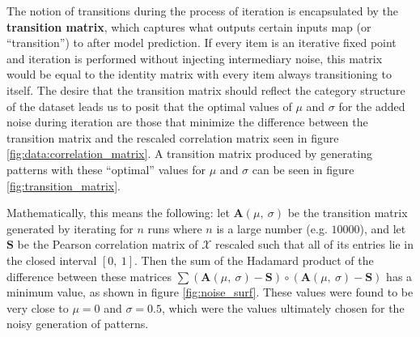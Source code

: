 \documentclass[11pt]{article}
\theoremstyle{remark}
\begin{document}
The notion of transitions during the process of iteration is encapsulated by the \textbf{transition matrix}, which captures what outputs certain inputs map (or ``transition'') to after model prediction. If every item is an iterative fixed point and iteration is performed without injecting intermediary noise, this matrix would be equal to the identity matrix with every item always transitioning to itself. The desire that the transition matrix should reflect the category structure of the dataset leads us to posit that the optimal values of $\mu$ and $\sigma$ for the added noise during iteration are those that minimize the difference between the transition matrix and the rescaled correlation matrix seen in figure \ref{fig:data:correlation_matrix}. A transition matrix produced by generating patterns with these ``optimal'' values for $\mu$ and $\sigma$ can be seen in figure \ref{fig:transition_matrix}.

Mathematically, this means the following: let $\mathbf{A}(\mu,\ \sigma)$ be the transition matrix generated by iterating for $n$ runs where $n$ is a large number (e.g. $10000$), and let $\mathbf{S}$ be the Pearson correlation matrix of $\mathcal{X}$ rescaled such that all of its entries lie in the closed interval $[0,\ 1]$. Then the sum of the Hadamard product of the difference between these matrices $\sum (\mathbf{A}(\mu,\ \sigma) - \mathbf{S}) \circ (\mathbf{A}(\mu,\ \sigma) - \mathbf{S})$ has a minimum value, as shown in figure \ref{fig:noise_surf}. These values were found to be very close to $\mu = 0$ and $\sigma = 0.5$, which were the values ultimately chosen for the noisy generation of patterns.
\end{document}
